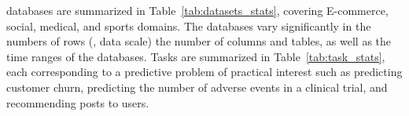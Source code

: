 
\relbench databases are summarized in Table~\ref{tab:datasets_stats}, covering E-commerce, social, medical, and sports domains. The databases vary significantly in the numbers of rows (\ie, data scale) the number of columns and tables, as well as the time ranges of the databases. Tasks are summarized in Table~\ref{tab:task_stats},  each corresponding to a predictive problem of practical interest such as predicting customer churn,  predicting the number of adverse events in a clinical trial, and recommending  posts to users.

